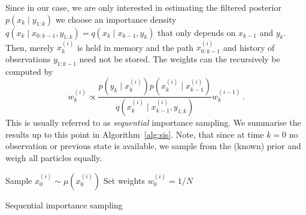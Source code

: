 Since in our case, we are only interested in estimating the filtered
posterior $p(x_k \mid y_{1:k})$ we choose an importance density
$q(x_k \mid x_{0:k-1}, y_{1:k}) = q(x_k \mid x_{k-1}, y_{k})$ that
only depends on $x_{k-1}$ and $y_k$. Then, merely $x_k^{(i)}$ is held
in memory and the path $x_{0:k-1}^{(i)}$ and history of observations
$y_{1:k-1}$ need not be stored. The weights can the recursively be
computed by
\begin{equation}
  \label{eq:weight_update}
  w_k^{(i)} \propto \frac{p(y_k \mid x_k^{(i)}) p(x_k^{(i)} \mid
    x_{k-1}^{(i)})}{q(x_k^{(i)} \mid x_{k-1}^{(i)}, y_{1:k})}
  w^{(i-1)}_k \,.
\end{equation}
This is usually referred to as \emph{sequential} importance sampling.
We summarise the results up to this point in Algorithm~\ref{alg:sis}.
Note, that since at time $k = 0$ no observation or previous state is
available, we sample from the (known) prior and weigh all particles
equally.
\begin{algorithm}[t]
  \SetAlgoLined {} Sample $x_0^{(i)} \sim \mu(x_0^{(i)})$ \;
  Set weights $w_0^{(i)} = 1/N$\;
  \caption{Sequential importance sampling}\label{alg:sis}
\end{algorithm}

